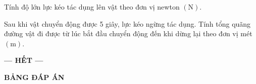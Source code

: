 \begin{ex}
	Tính độ lớn lực kéo tác dụng lên vật theo đơn vị newton $\left(\si{\newton}\right)$.	
	\loigiai{
	}
\end{ex}
\begin{ex}
	Sau khi vật chuyển động được 5 giây, lực kéo ngừng tác dụng. Tính tổng quãng đường vật đi được từ lúc bắt đầu chuyển động đến khi dừng lại theo đơn vị mét $\left(\si{\meter}\right)$.	
	\loigiai{
		
	}
\end{ex}
\begin{center}
	\textbf{--- HẾT ---}
\end{center}
\newpage
\setcounter{section}{0}
\begin{center}
	\textbf{\large BẢNG ĐÁP ÁN}
\end{center}
\section{}
\section{}
\section{}
